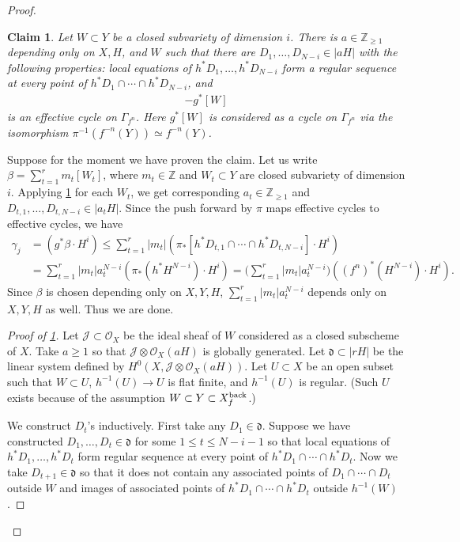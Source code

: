 \documentclass[12pt]{amsart}
\theoremstyle{plain}
\newtheorem{claim}[theorem]{Claim}
\theoremstyle{definition}
\numberwithin{equation}{section}
\def\Z{{\mathbb Z}}
\def\dd{{ \mathfrak{d}}}
\def\O{{ \mathcal{O}}}
\def\J{{ \mathcal{J}}}
\renewcommand{\b}{\beta}
\newcommand{\g}{\gamma}
\newcommand{\G}{\Gamma}
\begin{document}
\begin{proof}
\begin{claim}\label{claim:boundingbyci}
Let $W \subset Y$ be a closed subvariety of dimension $i$.
There is $a \in \Z_{\geq 1}$ depending only on $X, H$, and $W$ such that
there are $D_{1},\dots, D_{N-i} \in |aH|$ with the following properties:
local equations of $h^{*}D_{1},\dots, h^{*}D_{N-i}$ form a regular sequence 
at every point of $h^{*}D_{1}\cap \cdots \cap h^{*}D_{N-i}$, and 
\begin{align}
[h^{*}D_{1}\cap \cdots \cap h^{*}D_{N-i} ] - g^{*}[W]
\end{align}
is an effective cycle on $\G_{f^{n}}$.
Here $g^{*}[W]$ is considered as a cycle on $\G_{f^{n}}$ via the isomorphism 
$\pi^{-1}(f^{-n}(Y)) \simeq f^{-n}(Y)$.
\end{claim}

Suppose for the moment we have proven the claim.
Let us write $\b = \sum_{t=1}^{r}m_{t}[W_{t}]$, where $m_{t} \in \Z$ and $W_{t} \subset Y$
are closed subvariety of dimension $i$.
Applying \cref{claim:boundingbyci} for each $W_{t}$,
we get corresponding $a_{t} \in \Z_{\geq 1}$ and $D_{t,1},\dots ,D_{t,N-i} \in |a_{t}H|$. 
Since the push forward by $\pi$ maps effective cycles to effective cycles, we have
\begin{align}
\g_{j} &= (g^{*}\b \cdot H^{i}) \leq \sum_{t=1}^{r}|m_{t}| (\pi_{*} [h^{*}D_{t,1}\cap \cdots \cap h^{*}D_{t,N-i} ] \cdot H^{i})\\
&=\sum_{t=1}^{r}|m_{t}| a_{t}^{N-i} (\pi_{*}(h^{*}H^{N-i} )\cdot H^{i} ) 
= \big(\sum_{t=1}^{r}|m_{t}| a_{t}^{N-i} \big) ((f^{n})^{*}(H^{N-i}) \cdot H^{i}).
\end{align}
Since $\b$ is chosen depending only on $X, Y, H$, 
$\sum_{t=1}^{r}|m_{t}| a_{t}^{N-i} $ depends only on $X, Y, H$ as well.
Thus we are done.

\begin{proof}[Proof of \cref{claim:boundingbyci}]
Let $\J \subset \O_{X}$ be the ideal sheaf of $W$ considered as a closed subscheme of $X$.
Take $a \geq 1$ so that $\J \otimes \O_{X}(aH)$ is globally generated.
Let $\dd \subset |rH|$ be the linear system defined by $H^{0}(X, \J \otimes \O_{X}(aH))$.
Let $U \subset X$ be an open subset such that
$W \subset U$, $h^{-1}(U) \longrightarrow U$ is flat finite, and $h^{-1}(U)$ is regular.
(Such $U$ exists because of the assumption $W \subset Y \subset X_{f}^{\rm back}$.)

We construct $D_{t}$'s inductively.
First take any $D_{1} \in \dd$.
Suppose we have constructed $D_{1},\dots , D_{t} \in \dd$ for some $1 \leq t \leq N-i-1$
so that local equations of $h^{*}D_{1}, \dots , h^{*}D_{t}$ form regular sequence 
at every point of $h^{*}D_{1}\cap \cdots \cap h^{*}D_{t}$.
Now we take $D_{t+1} \in \dd$ so that it does not contain any
associated points of $D_{1} \cap \cdots \cap D_{t}$ outside $W$
and images of associated points of $h^{*}D_{1}\cap \cdots \cap h^{*}D_{t}$
outside $h^{-1}(W)$.


\end{proof}
\end{proof}
\end{document}
